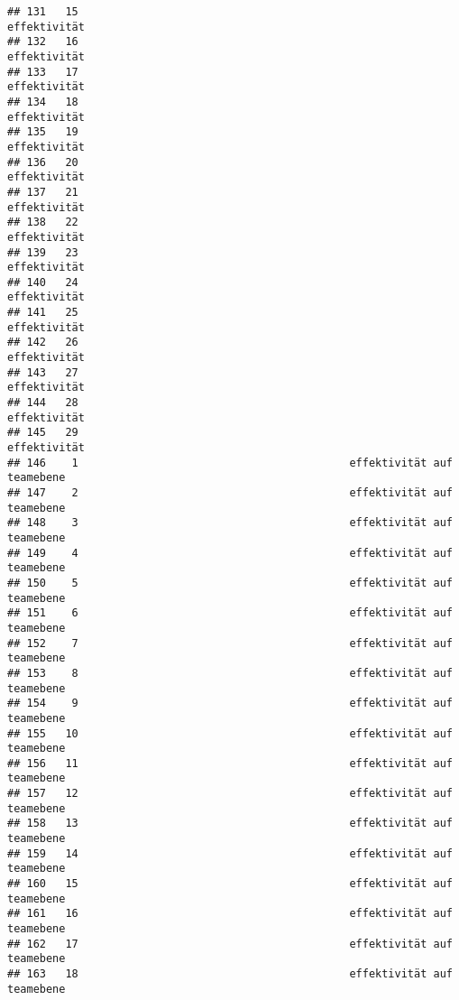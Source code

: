 \documentclass[
]{article}
\begin{document}
\begin{verbatim}
## 131   15                                                        effektivität
## 132   16                                                        effektivität
## 133   17                                                        effektivität
## 134   18                                                        effektivität
## 135   19                                                        effektivität
## 136   20                                                        effektivität
## 137   21                                                        effektivität
## 138   22                                                        effektivität
## 139   23                                                        effektivität
## 140   24                                                        effektivität
## 141   25                                                        effektivität
## 142   26                                                        effektivität
## 143   27                                                        effektivität
## 144   28                                                        effektivität
## 145   29                                                        effektivität
## 146    1                                          effektivität auf teamebene
## 147    2                                          effektivität auf teamebene
## 148    3                                          effektivität auf teamebene
## 149    4                                          effektivität auf teamebene
## 150    5                                          effektivität auf teamebene
## 151    6                                          effektivität auf teamebene
## 152    7                                          effektivität auf teamebene
## 153    8                                          effektivität auf teamebene
## 154    9                                          effektivität auf teamebene
## 155   10                                          effektivität auf teamebene
## 156   11                                          effektivität auf teamebene
## 157   12                                          effektivität auf teamebene
## 158   13                                          effektivität auf teamebene
## 159   14                                          effektivität auf teamebene
## 160   15                                          effektivität auf teamebene
## 161   16                                          effektivität auf teamebene
## 162   17                                          effektivität auf teamebene
## 163   18                                          effektivität auf teamebene

\end{verbatim}
\end{document}
